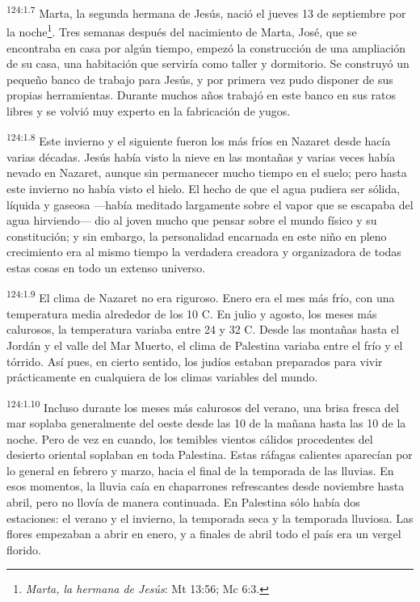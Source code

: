 \par 
\textsuperscript{124:1.7} Marta, la segunda hermana de Jesús, nació el jueves 13 de septiembre por la noche\footnote{\textit{Marta, la hermana de Jesús}: Mt 13:56; Mc 6:3.}. Tres semanas después del nacimiento de Marta, José, que se encontraba en casa por algún tiempo, empezó la construcción de una ampliación de su casa, una habitación que serviría como taller y dormitorio. Se construyó un pequeño banco de trabajo para Jesús, y por primera vez pudo disponer de sus propias herramientas. Durante muchos años trabajó en este banco en sus ratos libres y se volvió muy experto en la fabricación de yugos.

\par 
\textsuperscript{124:1.8} Este invierno y el siguiente fueron los más fríos en Nazaret desde hacía varias décadas. Jesús había visto la nieve en las montañas y varias veces había nevado en Nazaret, aunque sin permanecer mucho tiempo en el suelo; pero hasta este invierno no había visto el hielo. El hecho de que el agua pudiera ser sólida, líquida y gaseosa ---había meditado largamente sobre el vapor que se escapaba del agua hirviendo--- dio al joven mucho que pensar sobre el mundo físico y su constitución; y sin embargo, la personalidad encarnada en este niño en pleno crecimiento era al mismo tiempo la verdadera creadora y organizadora de todas estas cosas en todo un extenso universo.

\par 
\textsuperscript{124:1.9} El clima de Nazaret no era riguroso. Enero era el mes más frío, con una temperatura media alrededor de los 10{\textdegree} C. En julio y agosto, los meses más calurosos, la temperatura variaba entre 24{\textdegree} y 32{\textdegree} C. Desde las montañas hasta el Jordán y el valle del Mar Muerto, el clima de Palestina variaba entre el frío y el tórrido. Así pues, en cierto sentido, los judíos estaban preparados para vivir prácticamente en cualquiera de los climas variables del mundo.

\par 
\textsuperscript{124:1.10} Incluso durante los meses más calurosos del verano, una brisa fresca del mar soplaba generalmente del oeste desde las 10 de la mañana hasta las 10 de la noche. Pero de vez en cuando, los temibles vientos cálidos procedentes del desierto oriental soplaban en toda Palestina. Estas ráfagas calientes aparecían por lo general en febrero y marzo, hacia el final de la temporada de las lluvias. En esos momentos, la lluvia caía en chaparrones refrescantes desde noviembre hasta abril, pero no llovía de manera continuada. En Palestina sólo había dos estaciones: el verano y el invierno, la temporada seca y la temporada lluviosa. Las flores empezaban a abrir en enero, y a finales de abril todo el país era un vergel florido.

